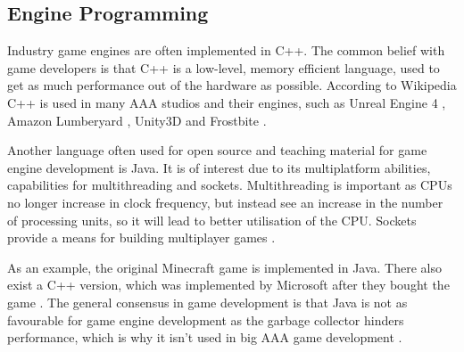 \subsection{Engine Programming} \label{sec:engine:programming}
Industry game engines are often implemented in C++. The common belief with game developers is that C++ is a low-level, memory efficient language, used to get as much performance out of the hardware as possible\cite{gamasutra:c++functional}. According to Wikipedia C++ is used in many AAA studios and their engines, such as Unreal Engine 4 \cite{EpicGamesRepo}, Amazon Lumberyard \cite{awsRepo}, Unity3D \cite{wiki:Unity3D} and Frostbite \cite{wiki:Frostbite}.

Another language often used for open source and teaching material for game engine development is Java\cite{Java:Gamedev-tutorials}. It is of interest due to its multiplatform abilities, capabilities for multithreading and sockets\cite{amador2014jot}. Multithreading is important as \acp{CPU} no longer increase in clock frequency, but instead see an increase in the number of processing units, so it will lead to better utilisation of the \ac{CPU}\cite{Pfeffer2004}. Sockets provide a means for building multiplayer games \cite{freelancer:EngineLanguages}.

As an example, the original Minecraft game is implemented in Java. There also exist a C++ version, which was implemented by Microsoft after they bought the game \cite{pcgamersn:Minecraftinc++}. The general consensus in game development is that Java is not as favourable for game engine development as the garbage collector hinders performance, which is why it isn't used in big AAA game development \cite{gamasutra:MemoryHandling,youtubeJonathanBlow}.


